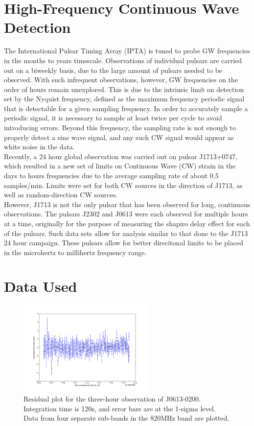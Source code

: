 \documentclass[12pt]{article}
\begin{document}
\section{High-Frequency Continuous Wave Detection}
    The International Pulsar Timing Array (IPTA) is tuned to probe GW
frequencies in the months to years timescale. Observations of individual pulsars
are carried out on a biweekly basis, due to the large amount of pulsars needed
to be observed. With such infrequent observations, however, GW frequencies on
the
order of hours remain unexplored. This is due to the intrinsic limit on
detection set by the Nyquist frequency, defined as the maximum frequency
periodic signal that is detectable for a given sampling frequency. In order to
accurately sample a periodic signal, it is necessary to sample at least twice
per cycle to avoid introducing errors. Beyond
this frequency, the sampling rate is not enough to properly detect a sine wave
signal, and any such CW signal would appear as white noise in the data.
\\
    Recently, a 24 hour global observation was carried out on pulsar J1713+0747, which
resulted in a new set of limits on Continuous Wave (CW) strain in the days to
hours frequencies due to the average sampling rate of about 0.5 samples/min.
Limits were set for both CW sources in the direction of J1713, as well as
random-direction CW sources.
\\
  However, J1713 is not the only pulsar that has been observed for long,
continuous observations. The pulsars J2302 and J0613 were each observed for
multiple hours at a time, originally for the purpose of measuring the shapiro
delay effect for each of the pulsars. Such data sets allow for analysis similar
to that done to the J1713 24 hour campaign. These pulsars allow for better
direcitonal limits to be placed in the microhertz to millihertz frequency range.

\section{Data Used}
 
\begin{figure}[h!]
    \caption{Residual plot for the three-hour observation of J0613-0200.
Integration time is 120s, and error bars are at the 1-sigma level. Data from
four separate sub-bands in the 820MHz band are plotted.}
    \includegraphics[width=0.6\textwidth]{./figures/J0613_residuals.png}
\end{figure}
\end{document}
